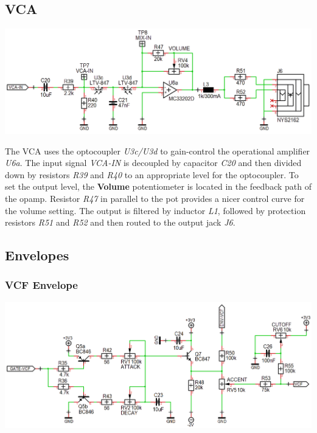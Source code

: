\documentclass{scrartcl}
\begin{document}
\subsection{VCA}

\begin{center}
    \includegraphics[scale=0.37]{assets/schema-vca.png}
\end{center}

The VCA uses the optocoupler \emph{U3c/U3d} to gain-control the operational amplifier \emph{U6a}. The input signal \emph{VCA-IN} is decoupled by capacitor \emph{C20} and then divided down by resistors \emph{R39} and \emph{R40} to an appropriate level for the optocoupler. To set the output level, the \textbf{Volume} potentiometer is located in the feedback path of the opamp. Resistor \emph{R47} in parallel to the pot provides a nicer control curve for the volume setting. The output is filtered by inductor \emph{L1}, followed by protection resistors \emph{R51} and \emph{R52} and then routed to the output jack \emph{J6}.

\subsection{Envelopes}

\subsubsection{VCF Envelope}

\begin{center}
    \includegraphics[scale=0.36]{assets/schema-ar.png}
\end{center}
\end{document}
